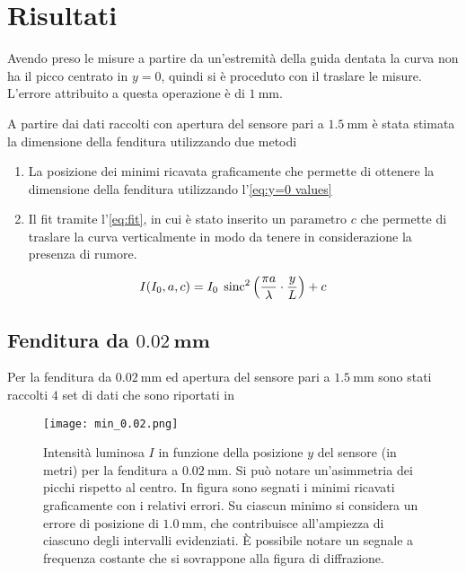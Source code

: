 \documentclass[../main.tex]{subfiles}
\begin{document}
\section{Risultati}

Avendo preso le misure a partire da un'estremità della guida dentata la curva non ha il picco centrato in $y = 0$, quindi si è proceduto con il traslare le misure. L'errore attribuito a questa operazione è di $\qty{1}{\mm}$.

A partire dai dati raccolti con apertura del sensore pari a $\qty{1.5}{\mm}$ 
è stata stimata la dimensione della fenditura utilizzando due metodi

\begin{enumerate}
    \item La posizione dei minimi ricavata graficamente che permette di ottenere la dimensione della fenditura utilizzando l'\autoref{eq:y=0 values}
    \item Il fit tramite l'\autoref{eq:fit}, in cui è stato inserito un parametro $c$ che permette di traslare la curva verticalmente in modo da tenere in considerazione la presenza di rumore.
\end{enumerate}

\begin{equation} \label{eq:fit}
    I(I_{0}, a, c) = I_{0} \; \operatorname{sinc}^{2} \left( \frac{\pi a}{\lambda} \cdot \frac{y}{L} \right) + c
\end{equation}

\subsection{Fenditura da $\mathbf{\qty{0.02}{\mm}}$}

Per la fenditura da $\qty{0.02}{\mm}$ ed apertura del sensore pari a $\qty{1.5}{\mm}$ sono stati raccolti $4$ set di dati che sono riportati in %

\begin{figure}[ht!]
    \centering
    \texttt{[image: min\_0.02.png]}
    \caption{Intensità luminosa $I$ in funzione della posizione $y$ del sensore (in metri) per la fenditura a $\qty{0.02}{\milli\metre}$. Si può notare un'asimmetria dei picchi  rispetto al centro. In figura sono segnati i minimi ricavati graficamente con i relativi errori. Su ciascun minimo si considera un errore di posizione di $\qty{1.0}{\mm}$, che contribuisce all'ampiezza di ciascuno degli intervalli evidenziati. È possibile notare un segnale a frequenza costante che si sovrappone alla figura di diffrazione.} %
    \label{fig:minimi 0.02}
\end{figure}
\end{document}
